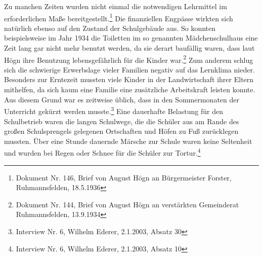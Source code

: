 \documentclass[a4paper]{article}
\begin{document}
Zu manchen Zeiten wurden nicht einmal die notwendigen Lehrmittel im
erforderlichen Maße bereitgestellt.\footnote{ Dokument Nr. 146, Brief
von August Högn an Bürgermeister Forster, Ruhmannsfelden, 18.5.1936}
Die finanziellen Engpässe wirkten sich natürlich ebenso auf den Zustand
der Schulgebäude aus. So konnten beispielsweise im Jahr 1934 die
Toiletten im so genannten Mädchenschulhaus eine Zeit lang gar nicht
mehr benutzt werden, da sie derart baufällig waren, dass laut Högn ihre
Benutzung lebensgefährlich für die Kinder war.\footnote{ Dokument Nr.
144, Brief von August Högn an verstärkten Gemeinderat Ruhmannsfelden,
13.9.1934} Zum anderem schlug sich die schwierige Erwerbslage vieler
Familien negativ auf das Lernklima nieder. Besonders zur Erntezeit
mussten viele Kinder in der Landwirtschaft ihrer Eltern mithelfen, da
sich kaum eine Familie eine zusätzliche Arbeitskraft leisten konnte.
Aus diesem Grund war es zeitweise üblich, dass in den Sommermonaten der
Unterricht gekürzt werden musste.\footnote{ Interview Nr. 6, Wilhelm
Ederer, 2.1.2003, Absatz 30} Eine dauerhafte Belastung für den
Schulbetrieb waren die langen Schulwege, die die Schüler aus am Rande
des großen Schulsprengels gelegenen Ortschaften und Höfen zu Fuß
zurücklegen mussten. Über eine Stunde dauernde Märsche zur Schule waren
keine Seltenheit und wurden bei Regen oder Schnee für die Schüler zur
Tortur.\footnote{ Interview Nr. 6, Wilhelm Ederer, 2.1.2003, Absatz 10}
\end{document}
